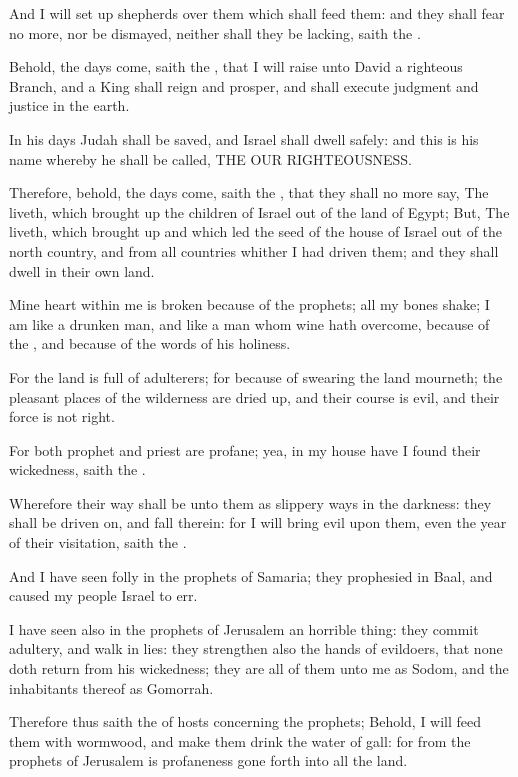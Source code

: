 \verse And I will set up shepherds over them which shall feed them: and they shall fear no more, nor be dismayed, neither shall they be lacking, saith the \LORD.

\verse Behold, the days come, saith the \LORD, that I will raise unto David a righteous Branch, and a King shall reign and prosper, and shall execute judgment and justice in the earth.

\verse In his days Judah shall be saved, and Israel shall dwell safely: and this is his name whereby he shall be called, THE \LORD OUR RIGHTEOUSNESS.

\verse Therefore, behold, the days come, saith the \LORD, that they shall no more say, The \LORD liveth, which brought up the children of Israel out of the land of Egypt; \verse But, The \LORD liveth, which brought up and which led the seed of the house of Israel out of the north country, and from all countries whither I had driven them; and they shall dwell in their own land.

\verse Mine heart within me is broken because of the prophets; all my bones shake; I am like a drunken man, and like a man whom wine hath overcome, because of the \LORD, and because of the words of his holiness.

\verse For the land is full of adulterers; for because of swearing the land mourneth; the pleasant places of the wilderness are dried up, and their course is evil, and their force is not right.

\verse For both prophet and priest are profane; yea, in my house have I found their wickedness, saith the \LORD.

\verse Wherefore their way shall be unto them as slippery ways in the darkness: they shall be driven on, and fall therein: for I will bring evil upon them, even the year of their visitation, saith the \LORD.

\verse And I have seen folly in the prophets of Samaria; they prophesied in Baal, and caused my people Israel to err.

\verse I have seen also in the prophets of Jerusalem an horrible thing: they commit adultery, and walk in lies: they strengthen also the hands of evildoers, that none doth return from his wickedness; they are all of them unto me as Sodom, and the inhabitants thereof as Gomorrah.

\verse Therefore thus saith the \LORD of hosts concerning the prophets; Behold, I will feed them with wormwood, and make them drink the water of gall: for from the prophets of Jerusalem is profaneness gone forth into all the land.

